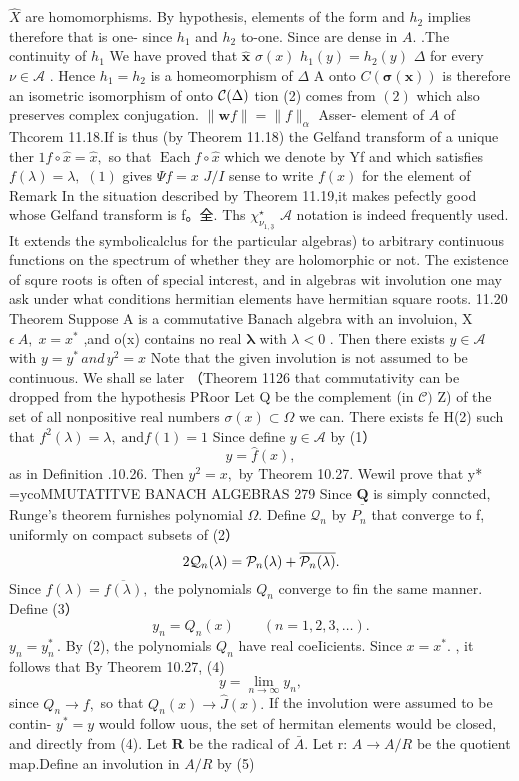 $\hat{X}$ are homomorphisms. By hypothesis, elements of the form and $h_{2}$ implies therefore that is one- since $h_{1}$ and $h_{2}$ to-one. Since are dense in $A.$ .The continuity of $h_{1}$ We have proved that $\hat{\mathbf{x}}$ $\sigma(x)$ $h_{1}(y)=h_{2}(y)$ $\Delta$ for every $\nu\in{\mathcal{A}}$ . Hence $h_{1}=h_{2}$ is a homeomorphism of $\Delta$ A onto $C({\boldsymbol{\sigma}}({\boldsymbol{x}}))$ is therefore an isometric isomorphism of onto ${\cal{C}}(\Delta)$ tion (2) comes from $\left(2\right)$ which also preserves complex conjugation. $\|\mathbf{w}f\|=\|f\|_{\alpha}$ Asser- element of $\textstyle A$ of Thcorem 11.18.If is thus (by Theorem 11.18) the Gelfand transform of a unique ther $1f\circ{\hat{x}}={\hat{x}},$ so that $\operatorname{Each}f\circ{\hat{x}}$ which we denote by Yf and which satisfies $f(\lambda)=\lambda,$ $\operatorname{\mathcal{(1)}}$ gives $\Psi f=x$ $J/I$ sense to write $f(x)$ for the element of Remark In the situation described by Theorem 11.19,it makes pefectly good whose Gelfand transform is f。全. Ths $\chi_{\nu_{1,\underline{{{3}}}}}^{\star}$ $\textstyle{\mathcal{A}}$ notation is indeed frequently used. It extends the symbolicalclus for the particular algebras) to arbitrary continuous functions on the spectrum of whether they are holomorphic or not. The existence of squre roots is often of special intcrest, and in algebras wit involution one may ask under what conditions hermitian elements have hermitian square roots. 11.20 Theorem Suppose A is a commutative Banach algebra with an involuion, X $\epsilon\:A,\;x=x^{*}$ ,and o(x) contains no real $\boldsymbol{\lambda}$ with $\scriptstyle\lambda<0$ . Then there exists $y\in{\mathcal{A}}$ with $\textstyle y=y^{*}\,a n d\,y^{2}=x$ Note that the given involution is not assumed to be continuous. We shall se later （Theorem 1126 that commutativity can be dropped from the hypothesis PRoor Let Q be the complement (in ${\mathcal{C}})$ Z) of the set of all nonpositive real numbers $\sigma(x)\subset\Omega$ we can. There exists fe H(2) such that $f^{2}(\lambda)=\lambda,\;\mathrm{and}f(1)=1$ Since define $\scriptstyle y\in{\mathcal{A}}$ by (1） $$ y={\hat{f}}(x), $$ as in Definition .10.26. Then $y^{2}=x,$ by Theorem 10.27. Wewil prove that y* =ycoMMUTATITVE BANACH ALGEBRAS 279 Since $\underline{{\mathbf{Q}}}$ is simply conncted, Runge's theorem furnishes polynomial $\Omega.$ Define ${\mathcal{Q}}_{n}$ by ${\mathbf{}}P_{n}$ that converge to f, uniformly on compact subsets of (2） $$ 2{\cal Q}_{n}(\lambda)={\cal P}_{n}(\lambda)+\overline{{{{\cal P}_{n}(\lambda)}}}. $$ Since $f(\lambda)={\overline{{f(\lambda)}}},$ the polynomials $Q_{n}$ converge to fin the same manner. Define (3） $$ y_{n}=Q_{n}(x)\qquad(n=1,2,3,\ldots). $$ $y_{n}=y_{n}^{*}\,.$ By (2), the polynomials $Q_{n}$ have real coeIicients. Since $x=x^{*}.$ , it follows that By Theorem 10.27, (4) $$ y=\operatorname*{lim}_{n\to\infty}y_{n}, $$ since $Q_{n}\to f,$ so that $Q_{n}(x)\to{\hat{J}}(x).$ If the involution were assumed to be contin- $y^{*}=y$ would follow uous, the set of hermitan elements would be closed, and directly from (4). Let ${\boldsymbol{R}}$ be the radical of ${\bar{A}}.$ Let r: $A\to A/R$ be the quotient map.Define an involution in $A/R$ by (5) $$ 